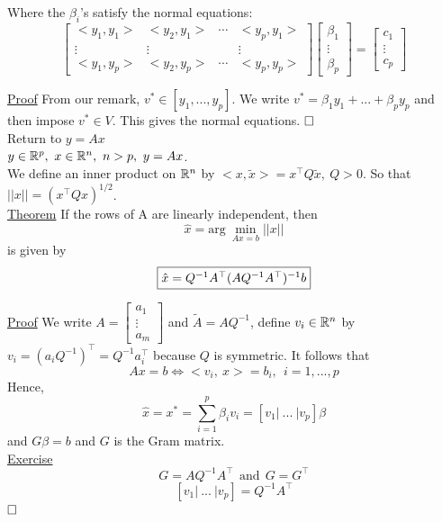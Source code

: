 \documentclass[letterpaper]{article}
\begin{document}
Where the $\beta_i$'s satisfy the normal equations:
$$\left[ \begin{array}{cccc} 
<y_1, y_1> & <y_2, y_1> & \cdots & <y_p, y_1> \\
\vdots & \vdots& & \vdots\\
<y_1, y_p> & <y_2, y_p> & \cdots & <y_p, y_p>
\end{array} \right] \begin{bmatrix} \beta_1 \\ \vdots \\ \beta_p \end{bmatrix} = \begin{bmatrix} c_1\\ \vdots \\c_p \end{bmatrix}$$

\underline{Proof} From our remark, $v^* \in [y_1, ..., y_p]$. We write $v^* = \beta_1 y_1 + ... +\beta_p y_p$ and then impose $v^* \in V$. This gives the normal equations. $\hfill \square$
\medskip \\

Return to $y = Ax$\\

$y \in \mathbb R^p, ~ x \in \mathbb R^n, ~ n > p, ~ y = Ax$.\\

We define an inner product on $\mathbb R^n$ by $<x, \tilde{x}> = x^\top Q \tilde{x}, ~ Q>0$. So that $||x|| = (x^\top Q x)^{1/2}$.\\

\underline{Theorem} If the rows of A are linearly independent, then 
$$\hat{x} = \mathrm{arg}~\min_{Ax = b} ||x||$$
is given by
$$\fbox{$\hat{x} = Q^{-1} A^\top (AQ^{-1}A^\top)^{-1} b$} $$

\underline{Proof} We write $A=\begin{bmatrix}a_1 \\ \vdots \\ a_m \end{bmatrix}$ and $\tilde{A} = AQ^{-1}$, define
$v_i \in \mathbb R^n $ by
$v_i = (a_i Q^{-1})^\top = Q^{-1} a_i^\top$
because $Q$ is symmetric. It follows that
$$Ax = b \iff <v_i, ~x> = b_i, ~~ i = 1,...,p$$
Hence,
$$\hat{x} = x^* = \sum \limits_{i=1}^{p} \beta_i v_i = [v_1 |~ ... ~|v_p] \beta$$ and $G \beta = b$ and $G$ is the Gram matrix.\\

\underline{Exercise} $$G = AQ^{-1}A^\top~~ \text{and} ~~G = G^\top$$
$$[v_1 | ~... ~|v_p] = Q^{-1}A^\top$$  $\hfill \square$
\end{document}
